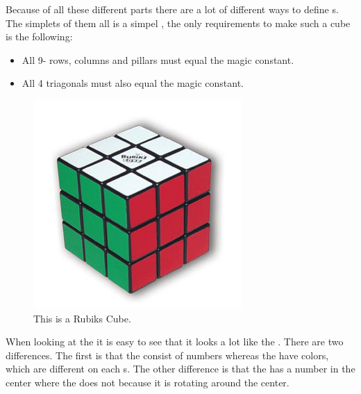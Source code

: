 Because of all these different parts there are a lot of different ways to define  \mcube{}s.
The simplets of them all is a simpel  \mcube{}, the only requirements to make such a cube is the following:
\begin{itemize}
	\item All 9- rows, columns and pillars must equal the magic constant.
	\item All 4 triagonals must also equal the magic constant.
\end{itemize}

\begin{figure}[h]
	\centering
		\includegraphics[scale=0.4]{input/pics/rubiksCube}
	\caption{This is a Rubiks Cube.}
	\label{fig:rubiksCube}
\end{figure}

When looking at the \rubik{} it is easy to see that it looks a lot like the \mcube{}. 
There are two differences. 
The first is that the \mcube{} consist of numbers whereas the \rubik{} have colors, which are different on each \face{}s.
The other difference is that the \mcube{} has a number in the center where the \rubik{} does not because it is rotating around the center. 
